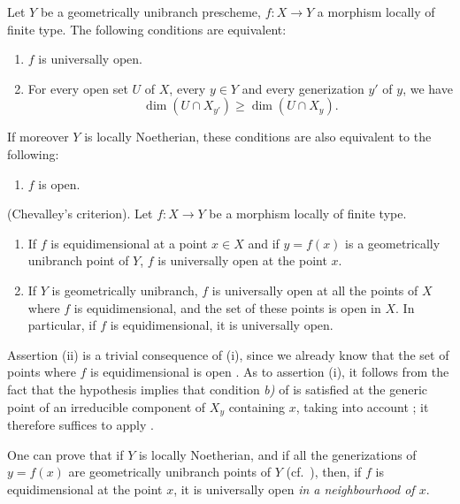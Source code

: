 \begin{corollary}[14.4.3]
\label{IV.14.4.3}
Let $Y$ be a geometrically unibranch prescheme, $f:X\to Y$ a morphism locally of finite type.
The following conditions are equivalent:
\begin{enumerate}[label=\emph{\alph*)}]
  \item $f$ is universally open.
  \item For every open set $U$ of $X$, every $y\in Y$ and every generization $y'$ of $y$, we have
    \[
      \dim(U\cap X_{y'})\geq\dim(U\cap X_y).
    \]
\end{enumerate}
If moreover $Y$ is locally Noetherian, these conditions are also equivalent to the following:
\begin{enumerate}[label=\emph{\alph*)}]
  \item[\emph{c)}] $f$ is open.
\end{enumerate}
\end{corollary}

\begin{corollary}[14.4.4]
\label{IV.14.4.4}
(Chevalley's criterion).
Let $f:X\to Y$ be a morphism locally of finite type.
\begin{enumerate}[label=(\roman*)]
  \item If $f$ is equidimensional at a point $x\in X$  and if $y=f(x)$ is a geometrically unibranch point of $Y$, $f$ is universally open at the point $x$.
  \item If $Y$ is geometrically unibranch, $f$ is universally open at all the points of $X$ where $f$ is equidimensional, and the set of these points is open in $X$.
In particular, if $f$ is equidimensional, it is universally open.
\end{enumerate}
\end{corollary}

Assertion (ii) is a trivial consequence of (i), since we already know that the set of points where $f$ is equidimensional is open .
As to assertion (i), it follows from the fact that the hypothesis implies that condition \emph{b)} of  is satisfied at the generic point of an irreducible component of $X_y$ containing $x$, taking into account ; it therefore suffices to apply .

\begin{remark}[14.4.5]
\label{IV.14.4.5}
One can prove that if $Y$ is locally Noetherian, and if all the generizations of $y=f(x)$ are geometrically unibranch points of $Y$ (cf.\ ), then, if $f$ is equidimensional at the point $x$, it is universally open \emph{in a neighbourhood of $x$}.
\end{remark}

